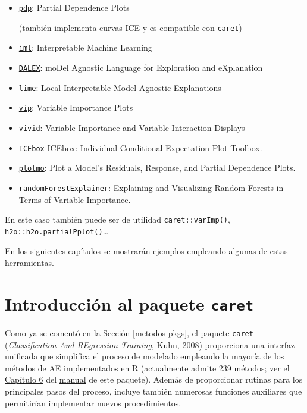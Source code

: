 \documentclass[
]{book}
\theoremstyle{break}
\theoremstyle{nonumberplain}
\begin{document}
\begin{itemize}
\item
  \href{https://bgreenwell.github.io/pdp/index.html}{\texttt{pdp}}: Partial Dependence Plots

  (también implementa curvas ICE y es compatible con \texttt{caret})
\item
  \href{https://christophm.github.io/iml}{\texttt{iml}}: Interpretable Machine Learning
\item
  \href{https://modeloriented.github.io/DALEX}{\texttt{DALEX}}: moDel Agnostic Language for Exploration and eXplanation
\item
  \href{https://lime.data-imaginist.com}{\texttt{lime}}: Local Interpretable Model-Agnostic Explanations
\item
  \href{https://koalaverse.github.io/vip/index.html}{\texttt{vip}}: Variable Importance Plots
\item
  \href{https://alaninglis.github.io/vivid}{\texttt{vivid}}: Variable Importance and Variable Interaction Displays
\item
  \href{https://CRAN.R-project.org/package=ICEbox}{\texttt{ICEbox}} ICEbox: Individual Conditional Expectation Plot Toolbox.
\item
  \href{http://www.milbo.users.sonic.net/}{\texttt{plotmo}}: Plot a Model's Residuals, Response, and Partial Dependence Plots.
\item
  \href{https://modeloriented.github.io/randomForestExplainer}{\texttt{randomForestExplainer}}: Explaining and Visualizing Random Forests in Terms of Variable Importance.
\end{itemize}

En este caso también puede ser de utilidad \texttt{caret::varImp()}, \texttt{h2o::h2o.partialPplot()}\ldots{}

En los siguientes capítulos se mostrarán ejemplos empleando algunas de estas herramientas.

\hypertarget{caret}{%
\section{\texorpdfstring{Introducción al paquete \texttt{caret}}{Introducción al paquete caret}}\label{caret}}

Como ya se comentó en la Sección \ref{metodos-pkgs}, el paquete \href{https://topepo.github.io/caret}{\texttt{caret}} (\emph{Classification And REgression Training}, \protect\hyperlink{ref-kuhn2008building}{Kuhn, 2008}) proporciona una interfaz unificada que simplifica el proceso de modelado empleando la mayoría de los métodos de AE implementados en R (actualmente admite 239 métodos; ver el \href{https://topepo.github.io/caret/available-models.html}{Capítulo 6} del \href{https://topepo.github.io/caret}{manual} de este paquete).
Además de proporcionar rutinas para los principales pasos del proceso, incluye también numerosas funciones auxiliares que permitirían implementar nuevos procedimientos.
\end{document}
